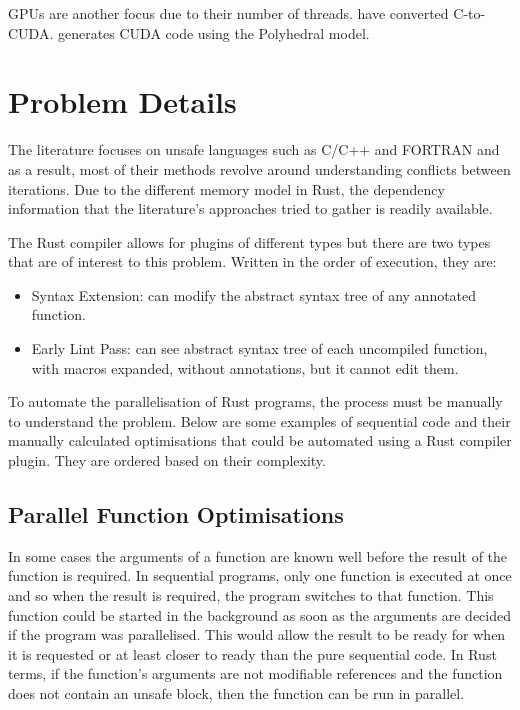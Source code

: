 \documentclass[conference]{IEEEtran}
\begin{document}
GPUs are another focus due to their number of threads.
\textcite{Baskaran2010} have converted C-to-CUDA.
\textcite{Verdoolaege2013} generates CUDA code using the Polyhedral model.

\section{Problem Details}
\label{sec:problem-details}

The literature focuses on unsafe languages such as C/C++ and FORTRAN and as a result, most of their methods revolve around understanding conflicts between iterations. Due to the different memory model in Rust, the dependency information that the literature's approaches tried to gather is readily available.

The Rust compiler allows for plugins of different types but there are two types that are of interest to this problem. Written in the order of execution, they are:
\begin{itemize}
    \item Syntax Extension: can modify the abstract syntax tree of any annotated function.
    \item Early Lint Pass: can see abstract syntax tree of each uncompiled function, with macros expanded, without annotations, but it cannot edit them.
\end{itemize}

To automate the parallelisation of Rust programs, the process must be manually to understand the problem. Below are some examples of sequential code and their manually calculated optimisations that could be automated using a Rust compiler plugin. They are ordered based on their complexity.


\subsection{Parallel Function Optimisations}
In some cases the arguments of a function are known well before the result of the function is required. In sequential programs, only one function is executed at once and so when the result is required, the program switches to that function. This function could be started in the background as soon as the arguments are decided if the program was parallelised. This would allow the result to be ready for when it is requested or at least closer to ready than the pure sequential code.
In Rust terms, if the function's arguments are not modifiable references and the function does not contain an unsafe block, then the function can be run in parallel.
\end{document}
